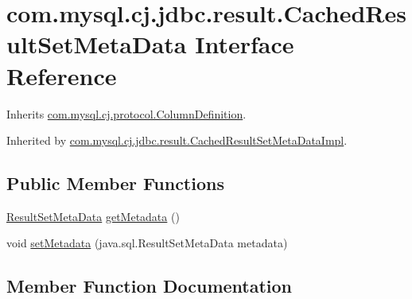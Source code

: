 \hypertarget{interfacecom_1_1mysql_1_1cj_1_1jdbc_1_1result_1_1_cached_result_set_meta_data}{}\section{com.\+mysql.\+cj.\+jdbc.\+result.\+Cached\+Result\+Set\+Meta\+Data Interface Reference}
\label{interfacecom_1_1mysql_1_1cj_1_1jdbc_1_1result_1_1_cached_result_set_meta_data}


Inherits \mbox{\hyperlink{interfacecom_1_1mysql_1_1cj_1_1protocol_1_1_column_definition}{com.\+mysql.\+cj.\+protocol.\+Column\+Definition}}.



Inherited by \mbox{\hyperlink{classcom_1_1mysql_1_1cj_1_1jdbc_1_1result_1_1_cached_result_set_meta_data_impl}{com.\+mysql.\+cj.\+jdbc.\+result.\+Cached\+Result\+Set\+Meta\+Data\+Impl}}.

\subsection*{Public Member Functions}
\begin{DoxyCompactItemize}
\item 
\mbox{\hyperlink{classcom_1_1mysql_1_1cj_1_1jdbc_1_1result_1_1_result_set_meta_data}{Result\+Set\+Meta\+Data}} \mbox{\hyperlink{interfacecom_1_1mysql_1_1cj_1_1jdbc_1_1result_1_1_cached_result_set_meta_data_a80240641b218f0bfb75d3a06669ab0c1}{get\+Metadata}} ()
\item 
void \mbox{\hyperlink{interfacecom_1_1mysql_1_1cj_1_1jdbc_1_1result_1_1_cached_result_set_meta_data_a29872cda6030096e51fc2397fa3b7135}{set\+Metadata}} (java.\+sql.\+Result\+Set\+Meta\+Data metadata)
\end{DoxyCompactItemize}


\subsection{Member Function Documentation}
\mbox{\label{interfacecom_1_1mysql_1_1cj_1_1jdbc_1_1result_1_1_cached_result_set_meta_data_a80240641b218f0bfb75d3a06669ab0c1}} 
